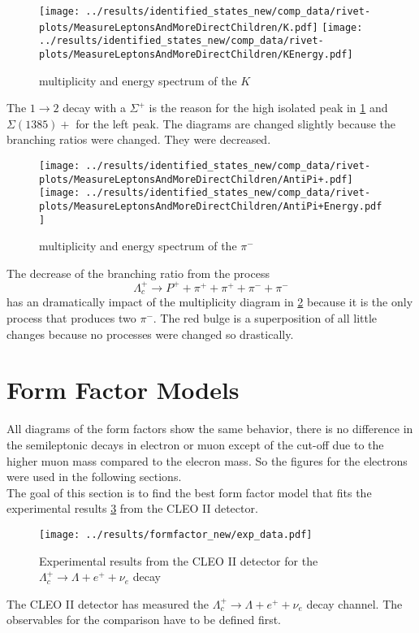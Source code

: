 \begin{figure}[h]
  \centering
  \texttt{[image: ../results/identified\_states\_new/comp\_data/rivet-plots/MeasureLeptonsAndMoreDirectChildren/K.pdf]}
  \texttt{[image: ../results/identified\_states\_new/comp\_data/rivet-plots/MeasureLeptonsAndMoreDirectChildren/KEnergy.pdf]}
  \caption{multiplicity and energy spectrum of the \(K\)} \label{gr:prim-K}
\end{figure}
The \( 1 \rightarrow 2 \) decay with a \(\Sigma^+\) is the reason for the high 
isolated peak in {\ref{gr:prim-K}}  and \(\Sigma(1385)+\) for the left peak. The diagrams are 
changed slightly  because the branching ratios were changed. They were decreased.\\

\begin{figure}[h]
  \centering
  \texttt{[image: ../results/identified\_states\_new/comp\_data/rivet-plots/MeasureLeptonsAndMoreDirectChildren/AntiPi+.pdf]}
  \texttt{[image: ../results/identified\_states\_new/comp\_data/rivet-plots/MeasureLeptonsAndMoreDirectChildren/AntiPi+Energy.pdf]}
  \caption{multiplicity and energy spectrum of the \(\pi^-\)} \label{gr:prim-pin}
\end{figure}
The decrease of the branching ratio from the process
\begin{equation}
  \Lambda_c^+ \rightarrow P^+ + \pi^+ + \pi^+ + \pi^- + \pi^- \nonumber
\end{equation}
has an dramatically impact of the multiplicity diagram in {\ref{gr:prim-pin}} because it is the only process 
that produces two \(\pi^-\). The red bulge is a superposition of all little changes 
because no processes were changed so drastically.


\clearpage
\section{Form Factor Models}
All diagrams of the form factors show the same behavior, there is no difference 
in the semileptonic decays in electron or muon except of the cut-off due to 
the higher muon mass compared to the elecron mass. So the figures for 
the electrons were used in the following sections.\\
The goal of this section is to find the best form factor model that fits 
the experimental results {\ref{gr:data}} from the CLEO II detector{\cite{data}}.
\begin{figure}[h]
  \centering
  \texttt{[image: ../results/formfactor\_new/exp\_data.pdf]}
  \caption{Experimental results from the CLEO II detector for the 
  \(\Lambda_c^+ \rightarrow \Lambda + e^+ + \nu_e\) decay} \label{gr:data}
\end{figure}
The CLEO II detector has measured the \(\Lambda_c^+ \rightarrow \Lambda + e^+ + \nu_e\)
 decay channel. The observables for the comparison have to be defined first.

